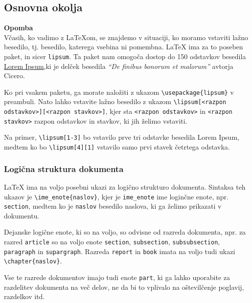 \subsection{Osnovna okolja}

\begin{framed}
\textbf{Opomba}\\
Včasih, ko vadimo z LaTeXom, se znajdemo v situaciji, ko moramo vstaviti lažno besedilo, tj. besedilo, katerega vsebina ni pomembna.
LaTeX ima za to poseben paket, in sicer \texttt{lipsum}.
Ta paket nam omogoča dostop do 150 odstavkov besedila \href{https://www.lipsum.com/}{Lorem Ipsum},ki je delček besedila \textit{``De finibus bonorum et malorum''} avtorja Cicero.

Ko pri vsakem paketu, ga morate naložiti z ukazom \texttt{{\textbackslash}usepackage\{lipsum\}} v preambuli.
Nato lahko vstavite lažno besedilo z ukazom \texttt{{\textbackslash}lipsum[\textless razpon odstavkov\textgreater ][\textless razpon stavkov\textgreater ]}, kjer sta \texttt{\textless razpon odstavkov\textgreater } in \texttt{\textless razpon stavkov\textgreater } razpon odstavkov in stavkov, ki jih želimo vstaviti.

Na primer, \texttt{{\textbackslash}lipsum[1-3]} bo vstavilo prve tri odstavke besedila Lorem Ipsum, medtem ko bo \texttt{{\textbackslash}lipsum[4][1]} vstavilo samo prvi stavek četrtega odstavka.
\end{framed}

\subsubsection{Logična struktura dokumenta}

LaTeX ima na voljo posebni ukazi za logično strukturo dokumenta.
Sintaksa teh ukazov je \texttt{{\textbackslash}ime\_enote\{naslov\}}, kjer je \texttt{ime\_enote} ime loginčne enote, npr. \texttt{section}, medtem ko je \texttt{naslov} besedilo naslova, ki ga želimo prikazati v dokumentu.

Dejanske logične enote, ki so na voljo, so odvisne od razreda dokumenta, npr. za razred \texttt{article} so na voljo enote \texttt{section}, \texttt{subsection}, \texttt{subsubsection}, \texttt{paragraph} in \texttt{supargraph}.\newline
Razreda \texttt{report} in \texttt{book} imata na voljo tudi ukazi \texttt{{\textbackslash}chapter\{naslov\}}.

\begin{example}\label{latexuvod_razdelki}\end{example}Vse te razrede dokumentov imajo tudi enote \texttt{part}, ki ga lahko uporabite za razdelitev dokumenta na več delov, ne da bi to vplivalo na oštevilčenje poglavij, razdelkov itd.


